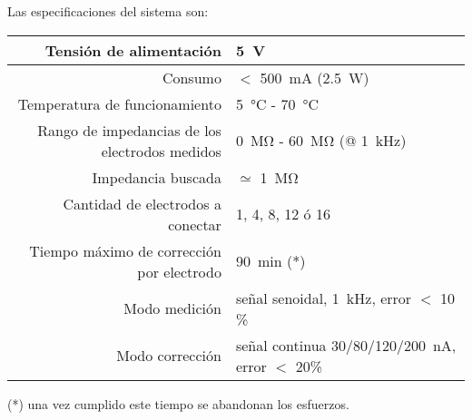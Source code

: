 Las especificaciones del sistema son:

\begin{table}[H]
\begin{center}
\begin{tabular}{|r|l|}
    \hline
    Tensión de alimentación &
    \SI{5}{\volt} \\ \hline
    Consumo &
    $<$ \SI{500}{\milli\ampere} (\SI{2.5}{\watt}) \\ \hline
    Temperatura de funcionamiento &
    \SI{5}{\celsius} - \SI{70}{\celsius} \\ \hline
    Rango de impedancias de los electrodos medidos &
    \SI{0}{\mega\ohm} - \SI{60}{\mega\ohm} (@ \SI{1}{\kilo\hertz})\\ \hline
    Impedancia buscada & $\simeq$ \SI{1}{\mega\ohm}\\ \hline
    Cantidad de electrodos a conectar &
    1, 4, 8, 12 ó 16 \\ \hline
    Tiempo máximo de corrección por electrodo &
    \SI{90}{\minute} (*)\\ \hline
    Modo medición & señal senoidal, \SI{1}{\kilo\hertz}, error $<$ 10 \% \\ \hline
    Modo corrección & señal continua 30/80/120/\SI{200}{\nano\ampere}, error $<$ 20\% \\ \hline
\end{tabular}
\end{center}
\end{table}

(*) una vez cumplido este tiempo se abandonan los esfuerzos.



